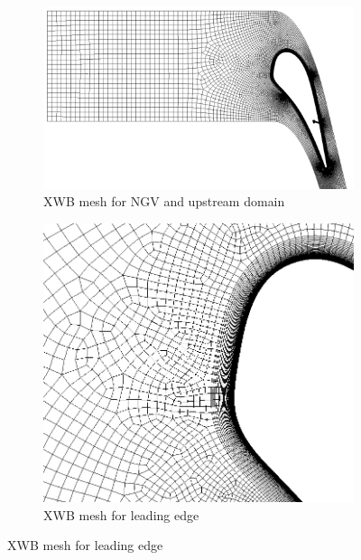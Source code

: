 \documentclass[a4paper, 11pt, oneside]{report}
\begin{document}
\begin{figure}[H]
  \centering
  \begin{subfigure}{.9\textwidth}
    \centering
    \includegraphics[width=\linewidth]{figs/SCH_mesh_domain_placeholder.png}
    \caption{XWB mesh for NGV and upstream domain}
    \label{fig:SCH_mesh_1}
  \end{subfigure}
  \vspace{0.05\textwidth}
  \begin{subfigure}{.45\textwidth}
    \centering
    \includegraphics[width=\linewidth]{figs/SCH_mesh_leading_edge_placeholder.png}
    \caption{XWB mesh for leading edge}
    \label{fig:SCH_mesh_2}
  \end{subfigure}
  \hspace{0.05\textwidth}

\end{figure}
\end{document}
